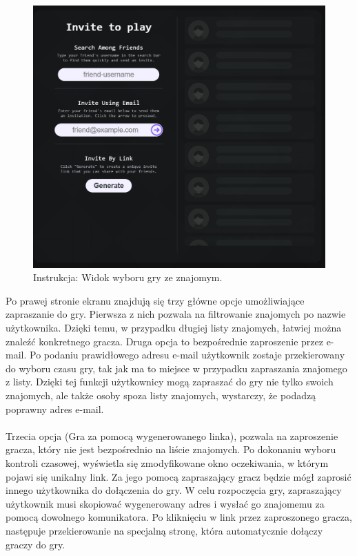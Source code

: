 \documentclass[twoside]{projektInzynierskiMS1}
\begin{document}
\vspace{0.5cm}
\begin{figure}[h!]
    \centering
    \includegraphics[width=1\textwidth]{images/ins_min_pvf.png}
    \caption{Instrukcja: Widok wyboru gry ze znajomym.}
\end{figure}

\newpage

\noindent
Po prawej stronie ekranu znajdują się trzy główne opcje umożliwiające zapraszanie do gry. Pierwsza z nich pozwala na filtrowanie znajomych po nazwie użytkownika. Dzięki temu, w przypadku długiej listy znajomych, łatwiej można znaleźć konkretnego gracza. Druga opcja to bezpośrednie zaproszenie przez e-mail. Po podaniu prawidłowego adresu e-mail użytkownik zostaje przekierowany do wyboru czasu gry, tak jak ma to miejsce w przypadku zapraszania znajomego z listy. Dzięki tej funkcji użytkownicy mogą zapraszać do gry nie tylko swoich znajomych, ale także osoby spoza listy znajomych, wystarczy, że podadzą poprawny adres e-mail.
\\\\
Trzecia opcja (Gra za pomocą wygenerowanego linka), pozwala na zaproszenie gracza, który nie jest bezpośrednio na liście znajomych. Po dokonaniu wyboru kontroli czasowej, wyświetla się zmodyfikowane okno oczekiwania, w którym pojawi się unikalny link. Za jego pomocą zapraszający gracz będzie mógł zaprosić innego użytkownika do dołączenia do gry. W celu rozpoczęcia gry, zapraszający użytkownik musi skopiować wygenerowany adres i wysłać go znajomemu za pomocą dowolnego komunikatora. Po kliknięciu w link przez zaproszonego gracza, następuje przekierowanie na specjalną stronę, która automatycznie dołączy graczy do gry.
\end{document}
